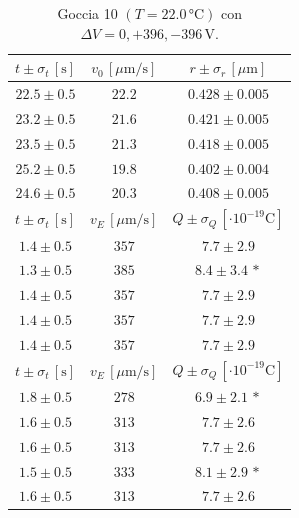 \documentclass[]{article}
\begin{document}
    \begin{table}[H]
        \centering
        \begin{tabular}{||c|c|c||}
            \hline
            $t \pm \sigma_t \, \left[\text{s}\right]$ & $v_0 \, \left[\mu\text{m/s}\right]$ & $r \pm \sigma_r \, \left[\mu\text{m}\right]$ \\\hline
            \hline
            $22.5 \pm 0.5$ & $22.2$ & $0.428 \pm 0.005$ \\\hline
            $23.2 \pm 0.5$ & $21.6$ & $0.421 \pm 0.005$ \\\hline
            $23.5 \pm 0.5$ & $21.3$ & $0.418 \pm 0.005$ \\\hline
            $25.2 \pm 0.5$ & $19.8$ & $0.402 \pm 0.004$ \\\hline
            $24.6 \pm 0.5$ & $20.3$ & $0.408 \pm 0.005$ \\\hline
            \hline
            $t \pm \sigma_t \, \left[\text{s}\right]$ & $v_E \, \left[\mu\text{m/s}\right]$ & $Q \pm \sigma_Q \, \left[\cdot 10^{-19} \text{C}\right]$ \\\hline
            \hline
            $1.4 \pm 0.5$ & $357$ & $7.7 \pm 2.9$ \\\hline
            $1.3 \pm 0.5$ & $385$ & $8.4 \pm 3.4\,\ast$ \\\hline
            $1.4 \pm 0.5$ & $357$ & $7.7 \pm 2.9$ \\\hline
            $1.4 \pm 0.5$ & $357$ & $7.7 \pm 2.9$ \\\hline
            $1.4 \pm 0.5$ & $357$ & $7.7 \pm 2.9$ \\\hline
            \hline
            $t \pm \sigma_t \, \left[\text{s}\right]$ & $v_E \, \left[\mu\text{m/s}\right]$ & $Q \pm \sigma_Q \, \left[\cdot 10^{-19} \text{C}\right]$ \\\hline
            \hline
            $1.8 \pm 0.5$ & $278$ & $6.9 \pm 2.1\,\ast$ \\\hline
            $1.6 \pm 0.5$ & $313$ & $7.7 \pm 2.6$ \\\hline
            $1.6 \pm 0.5$ & $313$ & $7.7 \pm 2.6$ \\\hline
            $1.5 \pm 0.5$ & $333$ & $8.1 \pm 2.9\,\ast$ \\\hline
            $1.6 \pm 0.5$ & $313$ & $7.7 \pm 2.6$ \\\hline
        \end{tabular}
        \caption{Goccia 10 $\left(T = 22.0\, \text{°C}\right)$ con $\Delta V = 0,+396,-396 \,\text{V}$.}
        \label{goccia-10}
    \end{table}
\end{document}
